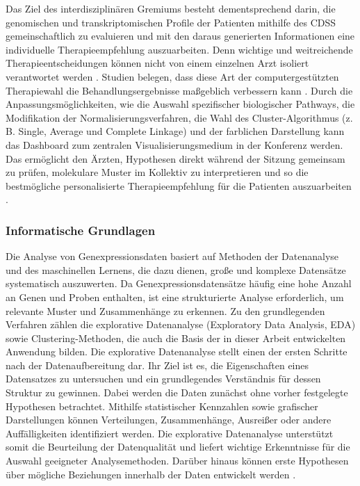 \documentclass[12pt]{article}
\begin{document}
Das Ziel des interdisziplinären Gremiums besteht dementsprechend darin, die genomischen und transkriptomischen Profile der Patienten mithilfe des CDSS gemeinschaftlich zu evaluieren und mit den daraus generierten Informationen eine individuelle Therapieempfehlung auszuarbeiten. Denn wichtige und weitreichende Therapieentscheidungen können nicht von einem einzelnen Arzt isoliert verantwortet werden \cite{Mosele2020}. Studien belegen, dass diese Art der computergestützten Therapiewahl die Behandlungsergebnisse maßgeblich verbessern kann \cite{Horak2021}. Durch die Anpassungsmöglichkeiten, wie die Auswahl spezifischer biologischer Pathways, die Modifikation der Normalisierungsverfahren, die Wahl des Cluster-Algorithmus (z.\,B. Single, Average und Complete Linkage) und der farblichen Darstellung kann das Dashboard zum zentralen Visualisierungsmedium in der Konferenz werden. Das ermöglicht den Ärzten, Hypothesen direkt während der Sitzung gemeinsam zu prüfen, molekulare Muster im Kollektiv zu interpretieren und so die bestmögliche personalisierte Therapieempfehlung für die Patienten auszuarbeiten \cite{PereraBel2018}.

\newpage
\pagestyle{fancy}
\fancyhead{}

\subsubsection{Informatische Grundlagen}
\label{info-grundlagen}

Die Analyse von Genexpressionsdaten basiert auf Methoden der Datenanalyse und des maschinellen Lernens, die dazu dienen, große und komplexe Datensätze systematisch auszuwerten. Da Genexpressionsdatensätze häufig eine hohe Anzahl an Genen und Proben enthalten, ist eine strukturierte Analyse erforderlich, um relevante Muster und Zusammenhänge zu erkennen. Zu den grundlegenden Verfahren zählen die explorative Datenanalyse (Exploratory Data Analysis, EDA) sowie Clustering-Methoden, die auch die Basis der in dieser Arbeit entwickelten Anwendung bilden.
Die explorative Datenanalyse stellt einen der ersten Schritte nach der Datenaufbereitung dar. Ihr Ziel ist es, die Eigenschaften eines Datensatzes zu untersuchen und ein grundlegendes Verständnis für dessen Struktur zu gewinnen. Dabei werden die Daten zunächst ohne vorher festgelegte Hypothesen betrachtet. Mithilfe statistischer Kennzahlen sowie grafischer Darstellungen können Verteilungen, Zusammenhänge, Ausreißer oder andere Auffälligkeiten identifiziert werden. Die explorative Datenanalyse unterstützt somit die Beurteilung der Datenqualität und liefert wichtige Erkenntnisse für die Auswahl geeigneter Analysemethoden. Darüber hinaus können erste Hypothesen über mögliche Beziehungen innerhalb der Daten entwickelt werden \cite{Komorowski2016}.
\end{document}
